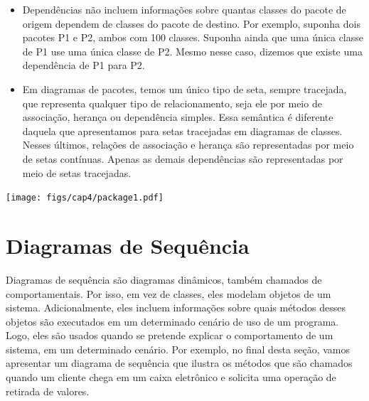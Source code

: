 \documentclass[
  11pt,
  twoside]{book}
\begin{document}
\begin{itemize}
\item
  Dependências não incluem informações sobre quantas classes do pacote
  de origem dependem de classes do pacote de destino. Por exemplo,
  suponha dois pacotes P1 e P2, ambos com 100 classes. Suponha ainda que
  uma única classe de P1 use uma única classe de P2. Mesmo nesse caso,
  dizemos que existe uma dependência de P1 para P2.
\item
  Em diagramas de pacotes, temos um único tipo de seta, sempre
  tracejada, que representa qualquer tipo de relacionamento, seja ele
  por meio de associação, herança ou dependência simples. Essa semântica
  é diferente daquela que apresentamos para setas tracejadas em
  diagramas de classes. Nesses últimos, relações de associação e herança
  são representadas por meio de setas contínuas. Apenas as demais
  dependências são representadas por meio de setas tracejadas.
\end{itemize}

\texttt{[image: figs/cap4/package1.pdf]}

\hypertarget{diagramas-de-sequuxeancia}{%
\section{Diagramas de Sequência}\label{diagramas-de-sequuxeancia}}

 

Diagramas de sequência são diagramas dinâmicos, também chamados de
comportamentais. Por isso, em vez de classes, eles modelam objetos de um
sistema. Adicionalmente, eles incluem informações sobre quais métodos
desses objetos são executados em um determinado cenário de uso de um
programa. Logo, eles são usados quando se pretende explicar o
comportamento de um sistema, em um determinado cenário. Por exemplo, no
final desta seção, vamos apresentar um diagrama de sequência que ilustra
os métodos que são chamados quando um cliente chega em um caixa
eletrônico e solicita uma operação de retirada de valores.
\end{document}

